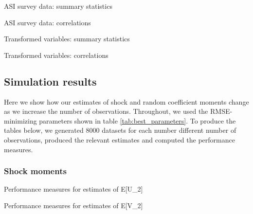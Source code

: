 \begin{table}[H]
  \singlespacing
  \caption{ASI survey data: summary statistics}
  
  \label{tab:summary_statistics_raw1}
\end{table}

\begin{table}[H]
  \singlespacing
  \caption{ASI survey data: correlations}
  
  \label{tab:summary_statistics_raw2}
\end{table}


\begin{table}[H]
  \singlespacing
  \caption{Transformed variables: summary statistics}
  
  \label{tab:summary_statistics_processed1}
\end{table}

\begin{table}[H]
  \singlespacing
  \caption{Transformed variables: correlations}
  
  \label{tab:summary_statistics_processed2}
\end{table}


\subsection{Simulation results}

Here we show how our estimates of shock and random coefficient moments change as we increase the number of observations. Throughout, we used the RMSE-minimizing parameters shown in table \ref{tab:best_parameters}. To produce the tables below, we generated 8000 datasets for each number different number of observations, produced the relevant estimates and computed the performance measures.

\subsubsection*{Shock moments}

\begin{table}[H]
  \singlespacing
  \caption{Performance measures for estimates of E[U_2]}
  
\end{table}

\begin{table}[H]
  \singlespacing
  \caption{Performance measures for estimates of E[V_2]}
  
\end{table}


